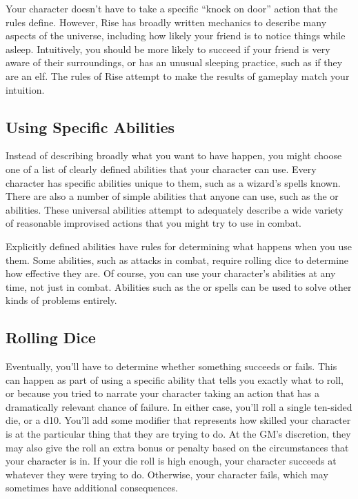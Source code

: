         Your character doesn't have to take a specific ``knock on door'' action that the rules define.
        However, Rise has broadly written mechanics to describe many aspects of the universe, including how likely your friend is to notice things while asleep.
        Intuitively, you should be more likely to succeed if your friend is very aware of their surroundings, or has an unusual sleeping practice, such as if they are an elf.
        The rules of Rise attempt to make the results of gameplay match your intuition.

    \subsection{Using Specific Abilities}
        Instead of describing broadly what you want to have happen, you might choose one of a list of clearly defined abilities that your character can use.
        Every character has specific abilities unique to them, such as a wizard's spells known.
        There are also a number of simple abilities that anyone can use, such as the  or  abilities.
        These universal abilities attempt to adequately describe a wide variety of reasonable improvised actions that you might try to use in combat.

        Explicitly defined abilities have rules for determining what happens when you use them.
        Some abilities, such as attacks in combat, require rolling dice to determine how effective they are.
        Of course, you can use your character's abilities at any time, not just in combat.
        Abilities such as the  or  spells can be used to solve other kinds of problems entirely.

    \subsection{Rolling Dice}
        Eventually, you'll have to determine whether something succeeds or fails.
        This can happen as part of using a specific ability that tells you exactly what to roll, or because you tried to narrate your character taking an action that has a dramatically relevant chance of failure.
        In either case, you'll roll a single ten-sided die, or a d10.
        You'll add some modifier that represents how skilled your character is at the particular thing that they are trying to do.
        At the GM's discretion, they may also give the roll an extra bonus or penalty based on the circumstances that your character is in.
        If your die roll is high enough, your character succeeds at whatever they were trying to do.
        Otherwise, your character fails, which may sometimes have additional consequences.

